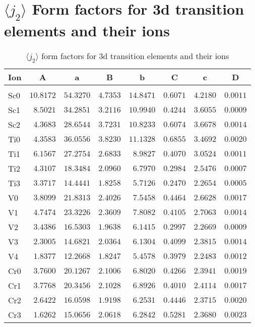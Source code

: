 \section{{\large $\langle j_2\rangle$} Form factors for 3d transition elements and their ions}
\label{3dj2}
\begin{table}[H]
\caption{
$\langle j_2\rangle$ form factors for 3d transition elements and their ions}
 \vspace{2mm}
{\tablesize
\begin{tabular}{lrrrrrrr}
\hline
Ion&
\multicolumn{1}{c}{A}&\multicolumn{1}{c}{a}&
\multicolumn{1}{c}{B}&\multicolumn{1}{c}{b}&
\multicolumn{1}{c}{C}&\multicolumn{1}{c}{c}&\multicolumn{1}{c}{D}\\
\hline\\[-2ex]
Sc0 &$10.8172$ &$54.3270$ &$4.7353$ &$14.8471$ &$0.6071$ &$4.2180$ &$0.0011$ \\
Sc1 &$8.5021$ &$34.2851$ &$3.2116$ &$10.9940$ &$0.4244$ &$3.6055$ &$0.0009$ \\
Sc2 &$4.3683$ &$28.6544$ &$3.7231$ &$10.8233$ &$0.6074$ &$3.6678$ &$0.0014$ \\
Ti0 &$4.3583$ &$36.0556$ &$3.8230$ &$11.1328$ &$0.6855$ &$3.4692$ &$0.0020$ \\
Ti1 &$6.1567$ &$27.2754$ &$2.6833$ &$8.9827$ &$0.4070$ &$3.0524$ &$0.0011$ \\
Ti2 &$4.3107$ &$18.3484$ &$2.0960$ &$6.7970$ &$0.2984$ &$2.5476$ &$0.0007$ \\
Ti3 &$3.3717$ &$14.4441$ &$1.8258$ &$5.7126$ &$0.2470$ &$2.2654$ &$0.0005$ \\
V0 &$3.8099$ &$21.8313$ &$2.4026$ &$7.5458$ &$0.4464$ &$2.6628$ &$0.0017$ \\
V1 &$4.7474$ &$23.3226$ &$2.3609$ &$7.8082$ &$0.4105$ &$2.7063$ &$0.0014$ \\
V2 &$3.4386$ &$16.5303$ &$1.9638$ &$6.1415$ &$0.2997$ &$2.2669$ &$0.0009$ \\
V3 &$2.3005$ &$14.6821$ &$2.0364$ &$6.1304$ &$0.4099$ &$2.3815$ &$0.0014$ \\
V4 &$1.8377$ &$12.2668$ &$1.8247$ &$5.4578$ &$0.3979$ &$2.2483$ &$0.0012$ \\
Cr0 &$3.7600$ &$20.1267$ &$2.1006$ &$6.8020$ &$0.4266$ &$2.3941$ &$0.0019$ \\
Cr1 &$3.7768$ &$20.3456$ &$2.1028$ &$6.8926$ &$0.4010$ &$2.4114$ &$0.0017$ \\
Cr2 &$2.6422$ &$16.0598$ &$1.9198$ &$6.2531$ &$0.4446$ &$2.3715$ &$0.0020$ \\
Cr3 &$1.6262$ &$15.0656$ &$2.0618$ &$6.2842$ &$0.5281$ &$2.3680$ &$0.0023$ \\

\end{tabular}}
\end{table}
